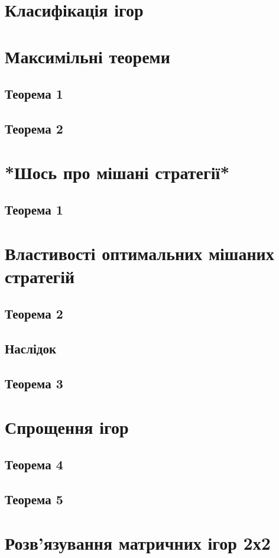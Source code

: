 \documentclass[12pt]{book}
\begin{document}
\section{Класифікація ігор}
\section{Максимільні теореми}
\subsection{Теорема 1}
\subsection{Теорема 2}
\section{*Шось про мішані стратегії*}
\subsection{Теорема 1}
\section{Властивості оптимальних мішаних стратегій}
\subsection{Теорема 2}
\subsection{Наслідок}
\subsection{Теорема 3}
\section{Спрощення ігор}
\subsection{Теорема 4}
\subsection{Теорема 5}
\section{Розв’язування матричних ігор 2х2}
\end{document}
